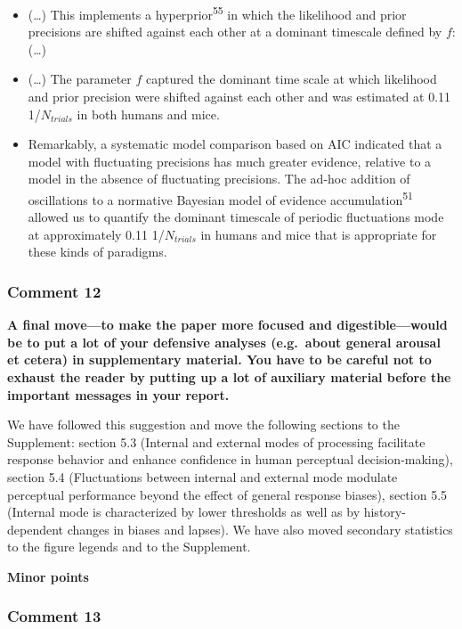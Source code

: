 \documentclass[
]{article}
\begin{document}
\begin{itemize}
\item
  (\ldots) This implements a hyperprior\textsuperscript{55} in which the
  likelihood and prior precisions are shifted against each other at a
  dominant timescale defined by \(f\): (\ldots)
\item
  (\ldots) The parameter \(f\) captured the dominant time scale at which
  likelihood and prior precision were shifted against each other and was
  estimated at 0.11 1/\(N_{trials}\) in both humans and mice.
\item
  Remarkably, a systematic model comparison based on AIC indicated that
  a model with fluctuating precisions has much greater evidence,
  relative to a model in the absence of fluctuating precisions. The
  ad-hoc addition of oscillations to a normative Bayesian model of
  evidence accumulation\textsuperscript{51} allowed us to quantify the
  dominant timescale of periodic fluctuations mode at approximately 0.11
  1/\(N_{trials}\) in humans and mice that is appropriate for these
  kinds of paradigms.
\end{itemize}

\hypertarget{comment-12}{%
\subsubsection{Comment 12}\label{comment-12}}

\textbf{A final move---to make the paper more focused and
digestible---would be to put a lot of your defensive analyses
(e.g.~about general arousal et cetera) in supplementary material. You
have to be careful not to exhaust the reader by putting up a lot of
auxiliary material before the important messages in your report.}

We have followed this suggestion and move the following sections to the
Supplement: section 5.3 (Internal and external modes of processing
facilitate response behavior and enhance confidence in human perceptual
decision-making), section 5.4 (Fluctuations between internal and
external mode modulate perceptual performance beyond the effect of
general response biases), section 5.5 (Internal mode is characterized by
lower thresholds as well as by history-dependent changes in biases and
lapses). We have also moved secondary statistics to the figure legends
and to the Supplement.

\textbf{Minor points}

\hypertarget{comment-13}{%
\subsubsection{Comment 13}\label{comment-13}}
\end{document}
